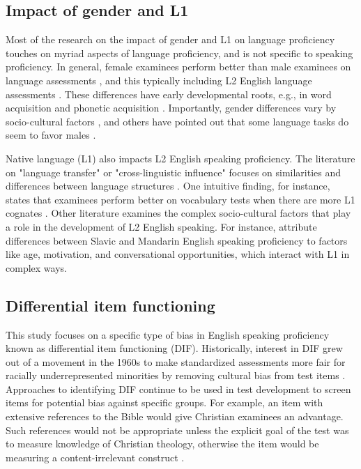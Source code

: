 \documentclass [PhD] {uclathes}
\begin{document}
\subsection{Impact of gender and L1}

Most of the research on the impact of gender and L1 on language proficiency touches on myriad aspects of language proficiency, and is not specific to speaking proficiency. In general, female examinees perform better than male examinees on language assessments \citep{reilly2019gender}, and this typically including L2 English language assessments \citep{denies2022mapping}. These differences have early developmental roots, e.g., in word acquisition \citep{kaushanskaya2013gender} and phonetic acquisition \citep{dodd2003phonological}. Importantly, gender differences vary by socio-cultural factors \citep{denies2022mapping}, and others have pointed out that some language tasks do seem to favor males \citep{wucherer2018language}. 

Native language (L1) also impacts L2 English speaking proficiency. The literature on "language transfer" or "cross-linguistic influence" focuses on similarities and differences between language structures \citep[][p. 257]{brown2000principles}. One intuitive finding, for instance, states that examinees perform better on vocabulary tests when there are more L1 cognates \citep{lesniewska2018first}. Other literature examines the complex socio-cultural factors that play a role in the development of L2 English speaking. For instance, \citet{derwing2013development} attribute differences between Slavic and Mandarin English speaking proficiency to factors like age, motivation, and conversational opportunities, which interact with L1 in complex ways. 

\subsection{Differential item functioning}
\label{intro_dif}

This study focuses on a specific type of bias in English speaking proficiency known as differential item functioning (DIF). Historically, interest in DIF grew out of a movement in the 1960s to make standardized assessments more fair for racially underrepresented minorities by removing cultural bias from test items \citep{angoff1993}. Approaches to identifying DIF continue to be used in test development to screen items for potential bias against specific groups. For example, an item with extensive references to the Bible would give Christian examinees an advantage. Such references would not be appropriate unless the explicit goal of the test was to measure knowledge of Christian theology, otherwise the item would be measuring a content-irrelevant construct \citep{aera2014}.
\end{document}
